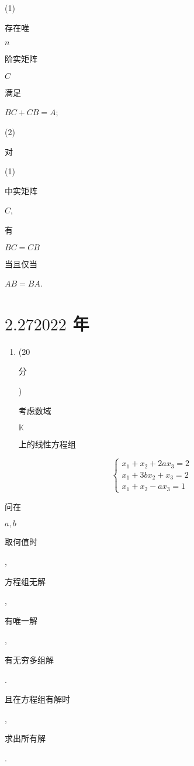 \documentclass[10pt]{article}
\begin{document}
(1) \begin{CJK}{UTF8}{mj}存在唯\end{CJK} $n$ \begin{CJK}{UTF8}{mj}阶实矩阵\end{CJK} $C$ \begin{CJK}{UTF8}{mj}满足\end{CJK} $B C+C B=A$;

(2) \begin{CJK}{UTF8}{mj}对\end{CJK} (1) \begin{CJK}{UTF8}{mj}中实矩阵\end{CJK} $C$, \begin{CJK}{UTF8}{mj}有\end{CJK} $B C=C B$ \begin{CJK}{UTF8}{mj}当且仅当\end{CJK} $A B=B A$.

\section{$2.272022$ 年}
\begin{enumerate}
  \item (20 \begin{CJK}{UTF8}{mj}分\end{CJK}) \begin{CJK}{UTF8}{mj}考虑数域\end{CJK} $\mathbb{K}$ \begin{CJK}{UTF8}{mj}上的线性方程组\end{CJK}
\end{enumerate}
$$
\left\{\begin{array}{l}
x_{1}+x_{2}+2 a x_{3}=2 \\
x_{1}+3 b x_{2}+x_{3}=2 \\
x_{1}+x_{2}-a x_{3}=1
\end{array}\right.
$$
\begin{CJK}{UTF8}{mj}问在\end{CJK} $a, b$ \begin{CJK}{UTF8}{mj}取何值时\end{CJK}, \begin{CJK}{UTF8}{mj}方程组无解\end{CJK}, \begin{CJK}{UTF8}{mj}有唯一解\end{CJK}, \begin{CJK}{UTF8}{mj}有无穷多组解\end{CJK}. \begin{CJK}{UTF8}{mj}且在方程组有解时\end{CJK}, \begin{CJK}{UTF8}{mj}求出所有解\end{CJK}.
\end{document}
